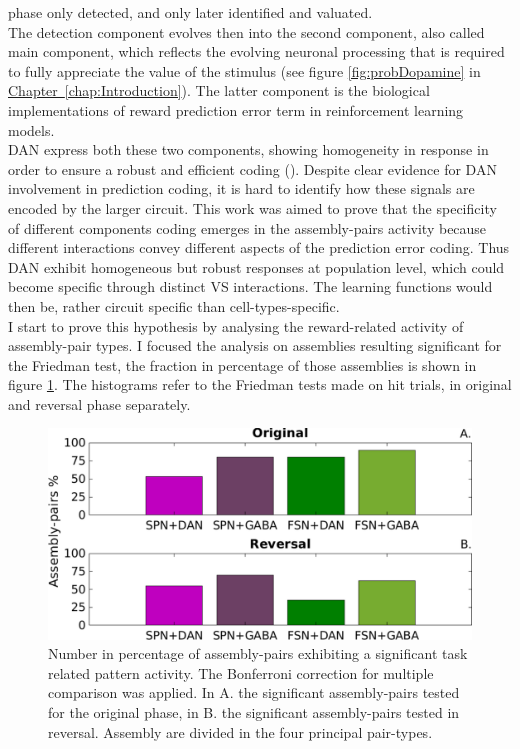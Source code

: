 phase only detected, and only later identified and valuated.\\The detection component evolves then into the second component, also called main component, which reflects the evolving neuronal processing that is required to fully appreciate the value of the stimulus (see figure \ref{fig:probDopamine} in \hyperref[chap:Introduction]{Chapter~\ref*{chap:Introduction}}). The latter component is the biological implementations of reward prediction error term in reinforcement learning models.\\DAN express both these two components, showing homogeneity in response in order to ensure a robust and efficient coding (\cite{UchidaDop}). Despite clear evidence for DAN involvement in prediction coding, it is hard to identify how these signals are encoded by the larger circuit. This work was aimed to prove that the specificity of different components coding emerges in the assembly-pairs activity because different interactions convey different aspects of the prediction error coding. Thus DAN exhibit homogeneous but robust responses at population level, which could become specific through distinct VS interactions. The learning functions would then be, rather circuit specific than cell-types-specific.\\I start to prove this hypothesis by analysing the reward-related activity of assembly-pair types. I focused the analysis on assemblies resulting significant for the Friedman test, the fraction in percentage of those assemblies is shown in figure \ref{fig:PercAsFried}. The histograms refer to the Friedman tests made on hit trials, in original and reversal phase separately.\\
\begin{figure}
\centering
\includegraphics[scale=0.47]{figures/PercFriedHitTrialsBFf.pdf}
\caption{Number in percentage of assembly-pairs exhibiting a significant task related pattern activity. The Bonferroni correction for multiple comparison was applied. In A. the significant assembly-pairs tested for the original phase, in B. the significant assembly-pairs tested in reversal. Assembly are divided in the four principal pair-types.}
\label{fig:PercAsFried}
\end{figure}
